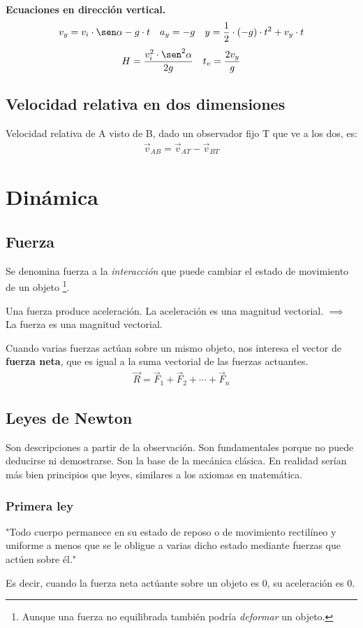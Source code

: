 \documentclass[12pt]{article}
\begin{document}
\textbf{Ecuaciones en dirección vertical.}
\begin{align*}
    v_{y} = v_{i}\cdot \sen \alpha - g\cdot t &  & a_{y} = -g &  & y = \frac{1}{2} \cdot (-g) \cdot t^{2} + v_{y} \cdot t
\end{align*}
\begin{align*}
    H = \frac{v_{i}^{2} \cdot \sen^{2}\alpha}{2g} &  & t_{v} = \frac{2v_{y}}{g}
\end{align*}

\subsection{Velocidad relativa en dos dimensiones}

Velocidad relativa de A visto de B, dado un observador fijo T que ve a los dos,
es:
\begin{align*}
    \vec{v}_{AB} = \vec{v}_{AT} - \vec{v}_{BT}
\end{align*}

\section{Dinámica}

\subsection{Fuerza}

Se denomina fuerza a la \textit{interacción} que puede cambiar el estado de
movimiento de un objeto
\footnote{Aunque una fuerza no equilibrada también podría \textit{deformar}
    un objeto.}.

Una fuerza produce aceleración. La aceleración es una magnitud vectorial.
\(\implies\) La fuerza es una magnitud vectorial.

Cuando varias fuerzas actúan sobre un mismo objeto,
nos interesa el vector de \textbf{fuerza neta},
que es igual a la suma vectorial de las fuerzas actuantes.
\begin{align*}
    \vec{R} = \vec{F}_{1} + \vec{F}_{2} + \cdots + \vec{F}_{n}
\end{align*}

\subsection{Leyes de Newton}

Son descripciones a partir de la observación.
Son fundamentales porque no puede deducirse ni demostrarse.
Son la base de la mecánica clásica.
En realidad serían más bien principios que leyes,
similares a los axiomas en matemática.

\subsubsection{Primera ley}

"Todo cuerpo permanece en su estado de reposo o de movimiento rectilíneo
y uniforme a menos que se le obligue a varias dicho estado mediante 
fuerzas que actúen sobre él."

Es decir,
cuando la fuerza neta actúante sobre un objeto es 0,
su aceleración es 0.
\end{document}
